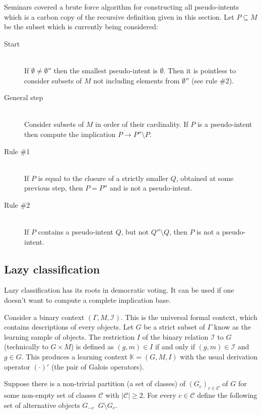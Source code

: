 \documentclass[a4paper]{article}
\newcommand{\brac}[1]{{\left ( #1 \right )}}
\newcommand{\abs}[1]{{\left | #1 \right |}}
\newcommand{\Ical}{\mathcal{I}}
\newcommand{\Ctx}{\mathbb{K}}
\newcommand{\defn}{\mathop{\overset{\Delta}{=}}\nolimits}
\begin{document}
Seminars covered a brute force algorithm for constructing all pseudo-intents which is a carbon copy of the recursive definition given in this section. Let $P\subseteq M$ be the subset which is currently being considered: \begin{description}
	\item[Start] \hfill \\ If $\emptyset\neq \emptyset''$ then the smallest pseudo-intent is $\emptyset$. Then it is pointless to consider subsets of $M$ not including elements from $\emptyset''$ (see rule \#2).
	\item[General step] \hfill \\ Consider subsets of $M$ in order of their cardinality. If $P$ is a pseudo-intent then compute the implication $P\to P''\setminus P$.
	\item[Rule \#1]\hfill \\ If $P$ is equal to the closure of a strictly smaller $Q$, obtained at some previous step, then $P=P''$ and is not a pseudo-intent.
	\item[Rule \#2]\hfill \\ If $P$ contains a pseudo-intent $Q$, but not $Q''\setminus Q$, then $P$ is not a pseudo-intent.
\end{description}

\subsection{Lazy classification} %
\label{sub:lazy_classification}

Lazy classification has its roots in democratic voting. It can be used if one doesn't want to compute a complete implication base.

Consider a binary context $(\Gamma, M, \Ical)$. This is the universal formal context, which contains descriptions of every objects. Let $G$ be a strict subset of $\Gamma$ know as the learning sample of objects. The restriction $I$ of the binary relation $\Ical$ to $G$ (technically to $G\times M$) is defined as $(g,m)\in I$ if and only if $(g,m)\in \Ical$ and $g\in G$. This produces a learning context $\Ctx = (G,M,I)$ with the usual derivation operator ${(\cdot)}'$ (the pair of Galois operators).

Suppose there is a non-trivial partition (a set of classes) of $\brac{G_c}_{c\in \mathcal{C}}$ of $G$ for some non-empty set of classes $\mathcal{C}$ with $\abs{\mathcal{C}}\geq 2$. For every $c\in \mathcal{C}$ define the following set of alternative objects $G_{-c} \defn G\setminus G_c$.
\end{document}
